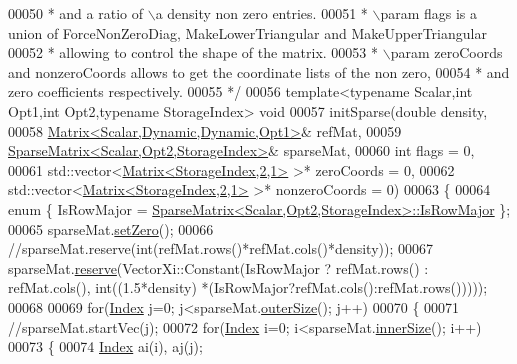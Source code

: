 \begin{DoxyCode}
00050 \textcolor{comment}{ * and a ratio of \(\backslash\)a density non zero entries.}
00051 \textcolor{comment}{ * \(\backslash\)param flags is a union of ForceNonZeroDiag, MakeLowerTriangular and MakeUpperTriangular}
00052 \textcolor{comment}{ *        allowing to control the shape of the matrix.}
00053 \textcolor{comment}{ * \(\backslash\)param zeroCoords and nonzeroCoords allows to get the coordinate lists of the non zero,}
00054 \textcolor{comment}{ *        and zero coefficients respectively.}
00055 \textcolor{comment}{ */}
00056 \textcolor{keyword}{template}<\textcolor{keyword}{typename} Scalar,\textcolor{keywordtype}{int} Opt1,\textcolor{keywordtype}{int} Opt2,\textcolor{keyword}{typename} StorageIndex> \textcolor{keywordtype}{void}
00057 initSparse(\textcolor{keywordtype}{double} density,
00058            \hyperlink{group___core___module_class_eigen_1_1_matrix}{Matrix<Scalar,Dynamic,Dynamic,Opt1>}& refMat,
00059            \hyperlink{group___sparse_core___module_class_eigen_1_1_sparse_matrix}{SparseMatrix<Scalar,Opt2,StorageIndex>}& sparseMat,
00060            \textcolor{keywordtype}{int} flags = 0,
00061            std::vector<\hyperlink{group___core___module_class_eigen_1_1_matrix}{Matrix<StorageIndex,2,1>} >* zeroCoords = 0,
00062            std::vector<\hyperlink{group___core___module_class_eigen_1_1_matrix}{Matrix<StorageIndex,2,1>} >* nonzeroCoords = 0)
00063 \{
00064   \textcolor{keyword}{enum} \{ IsRowMajor = \hyperlink{group___sparse_core___module_class_eigen_1_1_sparse_matrix}{SparseMatrix<Scalar,Opt2,StorageIndex>::IsRowMajor}
       \};
00065   sparseMat.\hyperlink{group___sparse_core___module_ad3c7416090f913e8685523cb3ab7c2f7}{setZero}();
00066   \textcolor{comment}{//sparseMat.reserve(int(refMat.rows()*refMat.cols()*density));}
00067   sparseMat.\hyperlink{group___sparse_core___module_a1518e58ac49bed0e2385b722a034f7d3}{reserve}(VectorXi::Constant(IsRowMajor ? refMat.rows() : refMat.cols(), int((1.5*density)
      *(IsRowMajor?refMat.cols():refMat.rows()))));
00068   
00069   \textcolor{keywordflow}{for}(\hyperlink{namespace_eigen_a62e77e0933482dafde8fe197d9a2cfde}{Index} j=0; j<sparseMat.\hyperlink{group___sparse_core___module_a4e5f706cfae14d2eaec1ea1e234905f1}{outerSize}(); j++)
00070   \{
00071     \textcolor{comment}{//sparseMat.startVec(j);}
00072     \textcolor{keywordflow}{for}(\hyperlink{namespace_eigen_a62e77e0933482dafde8fe197d9a2cfde}{Index} i=0; i<sparseMat.\hyperlink{group___sparse_core___module_a0f42824d4a06ee1d1f6afbc4551c5896}{innerSize}(); i++)
00073     \{
00074       \hyperlink{namespace_eigen_a62e77e0933482dafde8fe197d9a2cfde}{Index} ai(i), aj(j);

\end{DoxyCode}
